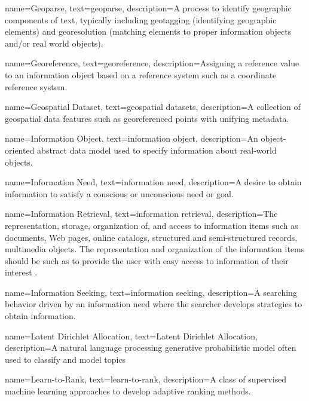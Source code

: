 {
    name=Geoparse,
    text=geoparse,
    description={A process to identify geographic components of text, typically including geotagging (identifying geographic elements) and georesolution (matching elements to proper information objects and/or real world objects).}
}

{
    name=Georeference,
    text=georeference,
    description=Assigning a reference value to an information object based on a reference system such as a coordinate reference system.
}

{
    name=Geospatial Dataset,
    text=geospatial datasets,
    description=A collection of geospatial data features such as georeferenced points with unifying metadata.
}

{
    name=Information Object,
    text=information object,
    description=An object-oriented abstract data model used to specify information about real-world objects.
}

{
    name=Information Need,
    text=information need,
    description=A desire to obtain information to satisfy a conscious or unconscious need or goal.
}

{
    name=Information Retrieval,
    text=information retrieval,
    description={The representation, storage, organization of, and access to information items such as documents, Web pages, online catalogs, structured and semi-structured records, multimedia objects. The representation and organization of the information items should be such as to provide the user with easy access to information of their interest \cite{Baeza-Yates1999}.}
}

{
    name=Information Seeking,
    text=information seeking,
    description=A searching behavior driven by an information need where the searcher develops strategies to obtain information.
}

{
    name=Latent Dirichlet Allocation,
    text=Latent Dirichlet Allocation,
    description=A natural language processing generative probabilistic model often used to classify and model topics
}

{
    name=Learn-to-Rank,
    text=learn-to-rank,
    description=A class of supervised machine learning approaches to develop adaptive ranking methods.
}

